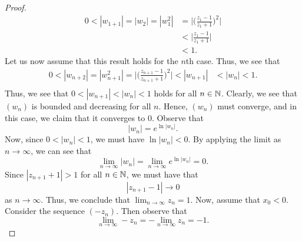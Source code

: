 \documentclass[a4paper]{article}
\begin{document}
\begin{enumerate}
\begin{proof}
        \begin{align*}
            0 < | {w}_{1 + 1} |  = | {w}_{2} | = | {w}_{1}^{2} | &= \Big| \Big(  \frac{ {z}_{1} - 1  }{  {z}_{1} + 1  } \Big)^{2} \Big|  \\
                                                             &< \Big|  \frac{ {z}_{1} - 1  }{ {z}_{1} + 1  }  \Big|  \\
                                                             &< 1.
        \end{align*}
        Let us now assume that this result holds for the \( n \)th case. Thus, we see that
        \begin{align*}
            0 < | {w}_{n+2} |  = | {w}_{n+1}^{2} | = \Big| \Big( \frac{ {z}_{n+1} - 1  }{  {z}_{n+1} + 1  }    \Big)^{2} \Big|  < | {w}_{n+1}   | &< | {w}_{n} | < 1. \\
        \end{align*}
        Thus, we see that \( 0 < | {w}_{n+1} | < | {w}_{n} |  < 1  \) holds for all \( n \in \mathbb{N}  \). Clearly, we see that \( ({w}_{n}) \) is bounded and decreasing for all \( n  \). Hence, \( ({w}_{n})  \) must converge, and in this case, we claim that it converges to \( 0  \). Observe that 
        \[  | {w}_{n} | = e^{\ln | {w}_{n} | }. \]
        Now, since \( 0 < | {w}_{n} |  < 1  \), we must have \( \ln | {w}_{n} | < 0  \). By applying the limit as \( n \to \infty  \), we can see that 
        \[  \lim_{ n \to \infty  }  | {w}_{n} |  = \lim_{ n \to \infty  }  e^{\ln | {w}_{n} | } = 0.  \]
        Since \( | {z}_{n+1} + 1  | > 1  \) for all \( n \in \mathbb{N}  \), we must have that 
        \[  | {z}_{n+1} - 1  | \to 0  \]
        as \( n \to \infty  \). Thus, we conclude that \( \lim_{ n \to \infty  } {z}_{n} = 1  \).
    Now, assume that \( {x}_{0} < 0  \). Consider the sequence \( (-{z}_{n}) \). Then observe that  
    \[  \lim_{ n \to \infty  } - {z}_{n} = - \lim_{ n \to \infty  } {z}_{n} = -1. \]
        



\end{proof}
\end{enumerate}
\end{document}
